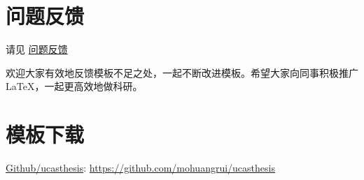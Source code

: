 \section{问题反馈}

请见 \href{https://github.com/mohuangrui/ucasthesis/wiki/%E5%B8%B8%E8%A7%81%E9%97%AE%E9%A2%98}{问题反馈} 

欢迎大家有效地反馈模板不足之处，一起不断改进模板。希望大家向同事积极推广\LaTeX{}，一起更高效地做科研。

\section{模板下载}

\begin{center}
	\href{https://github.com/mohuangrui/ucasthesis}{Github/ucasthesis}: \url{https://github.com/mohuangrui/ucasthesis}
\end{center}
